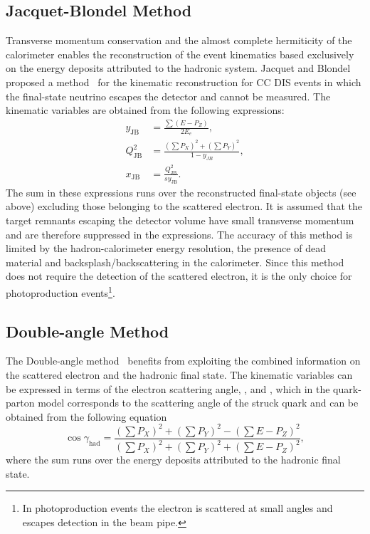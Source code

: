 \subsection{Jacquet-Blondel Method}
\label{subsec:jb}
Transverse momentum conservation and the almost complete hermiticity of the \zeus calorimeter enables the reconstruction of the event kinematics based exclusively on the energy deposits attributed to the hadronic system. Jacquet and Blondel proposed a method~\cite{proc:epfacility:1979:391} for the kinematic reconstruction for CC DIS events in which the final-state neutrino escapes the detector and cannot be measured. The kinematic variables are obtained from the following expressions:
\begin{align}
	y_\text{JB}      &= \frac{\sum{ \left( E - P_{Z} \right) }}{2E_e},			\label{eq:ybj} \\
	Q^2_\text{JB} &= \frac{ \left( \sum{P_{X}} \right)^2 + \left( \sum{P_{Y}} \right)^2 }{1-y_{JB}},			\label{eq:q2jb}							\\
	x_\text{JB}      &= \frac{Q^2_\text{JB}}{s y_\text{JB}}.			\label{eq:xjb}
\end{align}
The sum in these expressions runs over the reconstructed final-state objects (see above) excluding those belonging to the scattered electron. It is assumed that the target remnants escaping the detector volume have small transverse momentum and are therefore suppressed in the expressions. The accuracy of this method is limited by the hadron-calorimeter energy resolution, the presence of dead material and backsplash/backscattering in the calorimeter. Since this method does not require the detection of the scattered electron, it is the only choice for photoproduction events\footnote{In photoproduction events the electron is scattered at small angles and escapes detection in the beam pipe.}.
\subsection{Double-angle Method}
\label{subsec:da}
The Double-angle method~\cite{proc:hera:1991:23} benefits from exploiting the combined information on the scattered electron and the hadronic final state. The kinematic variables can be expressed in terms of the electron scattering angle, \thetae, and \gamha, which in the quark-parton model corresponds to the scattering angle of the struck quark and can be obtained from the following equation
\begin{equation}
\cos \gamma_{\text{had}} = \frac{ \left( \sum{P_{X}} \right)^2 + \left( \sum{P_{Y}} \right)^2 - (\sum{E - P_{Z}})^2 }{\left( \sum{P_{X}} \right)^2 + \left( \sum{P_{Y}} \right)^2 + (\sum{E - P_{Z}})^2},
\label{eq:cosgam}
\end{equation}
where the sum runs over the energy deposits attributed to the hadronic final state.

